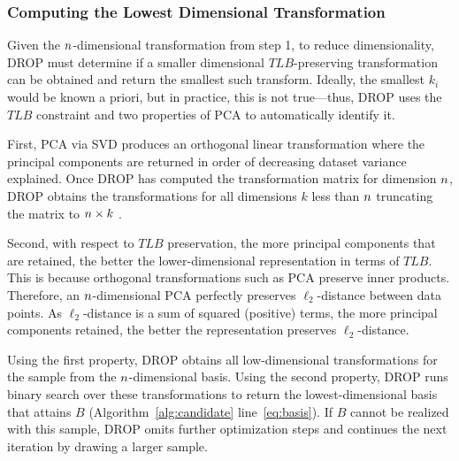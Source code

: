 \subsubsection{Computing the Lowest Dimensional Transformation}

Given the ${\color{black}n}$-dimensional transformation from step 1, to reduce dimensionality, DROP must determine if a smaller dimensional $TLB$-preserving transformation can be obtained and return the smallest such transform. 
Ideally, the smallest $k_i$ would be known a priori, but in practice, this is not true---thus, DROP uses the $TLB$ constraint and two properties of PCA to automatically identify it.

First, PCA via SVD produces an orthogonal linear transformation where the principal components  are returned in order of decreasing dataset variance explained.
Once DROP has computed the transformation matrix for dimension ${\color{black}n}$, DROP obtains the transformations for all dimensions $k$ less than ${\color{black}n}$ truncating the matrix to ${\color{black}n} \times k$ .

Second, with respect to $TLB$ preservation, the more principal components that are retained, the better the lower-dimensional representation in terms of $TLB$.  
This is because orthogonal transformations such as PCA preserve inner products. 
Therefore, an ${\color{black}n}$-dimensional PCA perfectly preserves $\ell_2$-distance between data points. 
As $\ell_2$-distance is a sum of squared (positive) terms, the more principal components retained, the better the representation preserves $\ell_2$-distance.

Using the first property, DROP obtains all low-dimensional transformations for the sample from the ${\color{black}n}$-dimensional basis.  
Using the second property, DROP runs binary search over these transformations to return the lowest-dimensional basis that attains $B$ (Algorithm~\ref{alg:candidate} line~\ref{eq:basis}).
If $B$ cannot be realized with this sample, DROP omits further optimization steps and continues the next iteration by drawing a larger sample.

